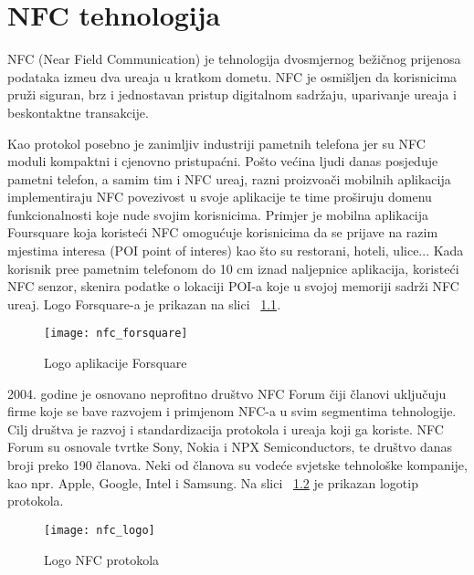 \chapter{NFC tehnologija}
NFC (Near Field Communication) je tehnologija dvosmjernog be\v{z}i\v{c}nog prijenosa podataka izme\dj u dva ure\dj aja u kratkom dometu. NFC je osmi\v{s}ljen da korisnicima pru\v{z}i siguran, brz i jednostavan pristup digitalnom sadr\v{z}aju, uparivanje ure\dj aja i beskontaktne transakcije.

Kao protokol posebno je zanimljiv industriji pametnih telefona jer su NFC moduli kompaktni i cjenovno pristupa\'{c}ni. Po\v{s}to ve\'{c}ina ljudi danas posjeduje pametni telefon, a samim tim i NFC ure\dj aj, razni proizvo\dj a\v{c}i mobilnih aplikacija implementiraju NFC povezivost u svoje aplikacije te time pro\v{s}iruju domenu funkcionalnosti koje nude svojim korisnicima. Primjer je mobilna aplikacija Foursquare \cite{foursquare} koja koriste\'{c}i NFC omogu\'{c}uje korisnicima da se prijave na razim mjestima interesa (POI point of interes) kao \v{s}to su restorani, hoteli, ulice... Kada korisnik pre\dj e pametnim telefonom do 10 cm iznad naljepnice aplikacija, koriste\'{c}i NFC senzor, skenira podatke o lokaciji POI-a koje u svojoj memoriji sadr\v{z}i NFC ure\dj aj. Logo Forsquare-a je prikazan na slici  ~\ref{fig:forsquare}.

\begin{figure}[!htbp]
	\begin{center}
 \texttt{[image: nfc\_forsquare]}
 \caption{Logo aplikacije Forsquare}
 \label{fig:forsquare}
	\end{center}
\end{figure}

2004. godine je osnovano neprofitno dru\v{s}tvo NFC Forum \cite{nfc_forum} \v{c}iji \v{c}lanovi uklju\v{c}uju firme koje se bave razvojem i primjenom NFC-a u svim segmentima tehnologije. Cilj dru\v{s}tva je razvoj i standardizacija protokola i ure\dj aja koji ga koriste. NFC Forum su osnovale tvrtke Sony, Nokia i NPX Semiconductors, te dru\v{s}tvo danas broji preko 190 \v{c}lanova. Neki od \v{c}lanova su vode\'{c}e svjetske tehnolo\v{s}ke kompanije, kao npr. Apple, Google, Intel i Samsung. Na slici  ~\ref{fig:nfc} je prikazan logotip protokola.

\begin{figure}[!htbp]
	\begin{center}
 \texttt{[image: nfc\_logo]}
 \caption{Logo NFC protokola}
 \label{fig:nfc}
	\end{center}
\end{figure}

